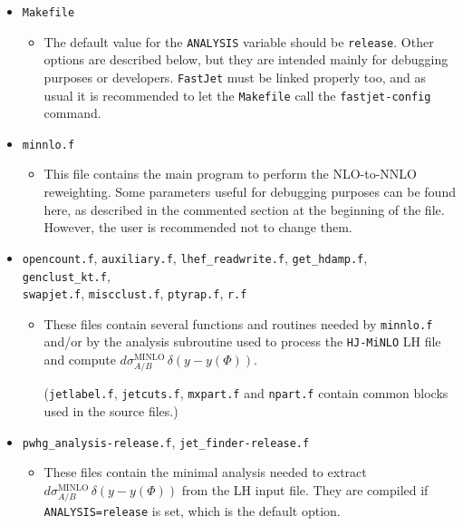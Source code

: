 \documentclass[11pt,a4paper]{article}
\newcommand{\noun}[1]{{\tt #1}}
\newcommand{\HJMINLO}{\noun{HJ-MiNLO}}
\newcommand{\FASTJET}{\noun{FastJet}}
\begin{document}
\begin{itemize}
  
\item {\tt{Makefile}}
  \begin{itemize}
  \item The default value for the {\tt ANALYSIS} variable should be
    {\tt release}. Other options are described below, but they are
    intended mainly for debugging purposes or developers. \FASTJET{}
    must be linked properly too, and as usual it is recommended to let
    the {\tt Makefile} call the {\tt fastjet-config} command.
  \end{itemize}
  
\item {\tt{minnlo.f}}
  \begin{itemize}
  \item This file contains the main program to perform the NLO-to-NNLO
    reweighting. Some parameters useful for debugging purposes can be
    found here, as described in the commented section at the beginning
    of the file. However, the user is recommended not to change them.
  \end{itemize}
  
\item {{\tt opencount.f}, {\tt auxiliary.f}, {\tt lhef\_readwrite.f},
    {\tt get\_hdamp.f}, {\tt genclust\_kt.f}, \\ 
   {\tt swapjet.f},
    {\tt miscclust.f}, {\tt ptyrap.f}, {\tt r.f}}
  \begin{itemize}
  \item These files contain several functions and routines needed by
    {\tt minnlo.f} and/or by the analysis subroutine used to process
    the \HJMINLO{} LH file and compute
    $d\sigma_{A/B}^{{\scriptscriptstyle
        \mathrm{MINLO}}}\,\delta\left(y-y\left(\Phi\right)\right)$.
  
  ({\tt jetlabel.f}, {\tt jetcuts.f}, {\tt mxpart.f} and {\tt npart.f}
  contain common blocks used in the source files.)
\end{itemize}

\item {{\tt pwhg\_analysis-release.f}, {\tt jet\_finder-release.f}}
  \begin{itemize}
  \item These files contain the minimal analysis needed to extract
    $d\sigma_{A/B}^{{\scriptscriptstyle
        \mathrm{MINLO}}}\,\delta\left(y-y\left(\Phi\right)\right)$
  from the LH input file. They are compiled if {\tt ANALYSIS=release}
  is set, which is the default option.
\end{itemize}


\end{itemize}
\end{document}
